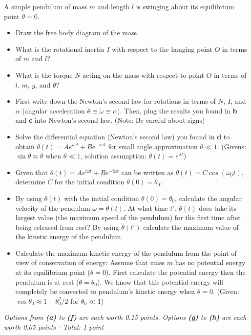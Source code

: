 \documentclass{homework}
\begin{document}
A simple pendulum of mass $m$ and length $l$ is swinging about its equilibrium point $\theta=0$.
\begin{itemize}
    \item[\textbf{(a)}] Draw the free body diagram of the mass.
    \item[\textbf{(b)}] What is the rotational inertia $I$ with respect to the hanging point $O$ in terms of $m$ and $l$?.
    \item[\textbf{(c)}] What is the torque $N$ acting on the mass with respect to point $O$ in terms of $l$, $m$, $g$, and $\theta$?
    \item[\textbf{(d)}] First write down the Newton's second law for rotations in terms of $N$, $I$, and $\alpha$ (angular acceleration $\ddot{\theta}\equiv \dot{\omega}\equiv \alpha$). Then, plug the results you found in \textbf{b} and \textbf{c} into Newton's second law. (Note: Be careful about signs)
    \item[\textbf{(e)}] Solve the differential equation (Newton's second law) you found in \textbf{d} to obtain $\theta(t)=Ae^{i\omega t}+Be^{-i\omega t}$ for small angle approximation $\theta \ll 1$. (Givens: $\sin\theta\approx \theta$ when $\theta\ll 1$, solution assumption: $\theta(t)=e^{\lambda t}$)
    \item[\textbf{(f)}] Given that $\theta(t)=Ae^{i\omega t}+Be^{-i\omega t}$ can be written as $\theta(t)=C\cos(\omega_0t)$, determine $C$ for the initial condition $\theta(0)=\theta_0$.
    \item[\textbf{(g)}] By using $\theta(t)$ with the initial condition $\theta(0)=\theta_0$, calculate the angular velocity of the pendulum $\omega=\dot{\theta}(t)$. At what time $t'$, $\dot{\theta}(t)$ does take its largest value (the maximum speed of the pendulum) for the first time after being released from rest? By using $\dot{\theta}(t')$ calculate the maximum value of the kinetic energy of the pendulum.
    \item[\textbf{(h)}] Calculate the maximum kinetic energy of the pendulum from the point of view of conservation of energy: Assume that mass $m$ has no potential energy at its equilibrium point ($\theta=0$). First calculate the potential energy then the pendulum is at rest ($\theta=\theta_0$). We know that this potential energy will completely be converted to pendulum's kinetic energy when $\theta=0$. (Given: $\cos\theta_0\approx 1-\theta_0^2/2$ for $\theta_0\ll 1$)
    \end{itemize}

\textit{Options from \textbf{(a)} to \textbf{(f)} are each worth 0.15 points. Options \textbf{(g)} to \textbf{(h)} are each worth 0.05 points - Total: 1 point} 
\end{document}
